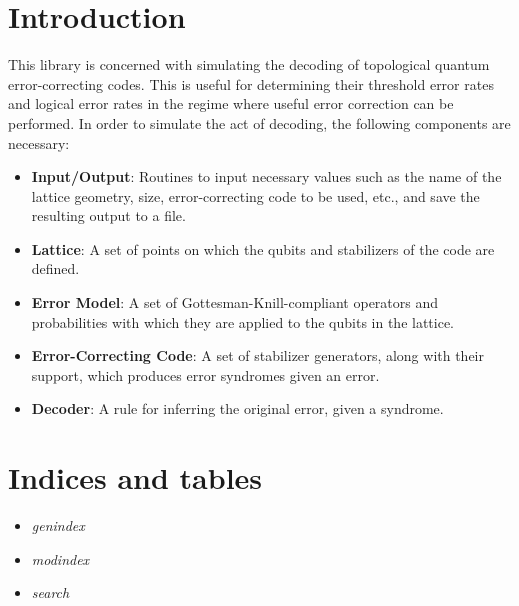 \documentclass[letterpaper,10pt,english]{sphinxmanual}
\begin{document}
\chapter{Introduction}
\label{index:introduction}
This library is concerned with simulating the decoding of topological quantum error-correcting codes. This is useful for determining their threshold error rates and logical error rates in the regime where useful error correction can be performed. In order to simulate the act of decoding, the following components are necessary:
\begin{itemize}
\item {} 
\textbf{Input/Output}: Routines to input necessary values such as the name of the lattice geometry, size, error-correcting code to be used, etc., and save the resulting  output to a file.

\item {} 
\textbf{Lattice}: A set of points on which the qubits and stabilizers of the code are defined.

\item {} 
\textbf{Error Model}: A set of Gottesman-Knill-compliant operators and probabilities with which they are applied to the qubits in the lattice.

\item {} 
\textbf{Error-Correcting Code}: A set of stabilizer generators, along with their support, which produces error syndromes given an error.

\item {} 
\textbf{Decoder}: A rule for inferring the original error, given a syndrome.

\end{itemize}


\chapter{Indices and tables}
\label{index:indices-and-tables}\begin{itemize}
\item {} 
\emph{genindex}

\item {} 
\emph{modindex}

\item {} 
\emph{search}

\end{itemize}



\renewcommand{\indexname}{Index}
\printindex
\end{document}
